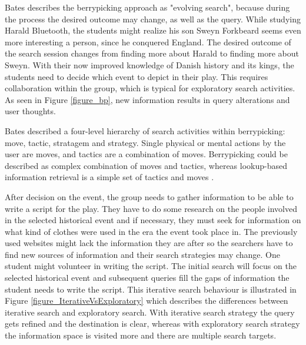 Bates \cite{bates89} describes the berrypicking approach as "evolving search", because during the process the desired outcome may change, as well as the query.
While studying Harald Bluetooth, the students might realize his son Sweyn Forkbeard seems even more interesting a person, since he conquered England.
The desired outcome of the search session changes from finding more about Harald to finding more about Sweyn.
With their now improved knowledge of Danish history and its kings, the students need to decide which event to depict in their play.
This requires collaboration within the group, which is typical for exploratory search activities.
As seen in Figure \ref{figure_bp}, new information results in query alterations and user thoughts.

Bates \cite{bates90} described a four-level hierarchy of search activities within berrypicking: move, tactic, stratagem and strategy.
Single physical or mental actions by the user are moves, and tactics are a combination of moves. 
Berrypicking could be described as complex combination of moves and tactics, whereas lookup-based information retrieval is a simple set of tactics and moves \cite{white09}.

After decision on the event, the group needs to gather information to be able to write a script for the play.
They have to do some research on the people involved in the selected historical event and if necessary, they must seek for information on what kind of clothes were used in the era the event took place in.
The previously used websites might lack the information they are after so the searchers have to find new sources of information and their search strategies may change.
One student might volunteer in writing the script.
The initial search will focus on the selected historical event and subsequent queries fill the gaps of information the student needs to write the script.
This iterative search behaviour is illustrated in Figure \ref{figure_IterativeVsExploratory} which describes the differences between iterative search and exploratory search.
With iterative search strategy the query gets refined and the destination is clear, whereas with exploratory search strategy the information space is visited more and there are multiple search targets.

